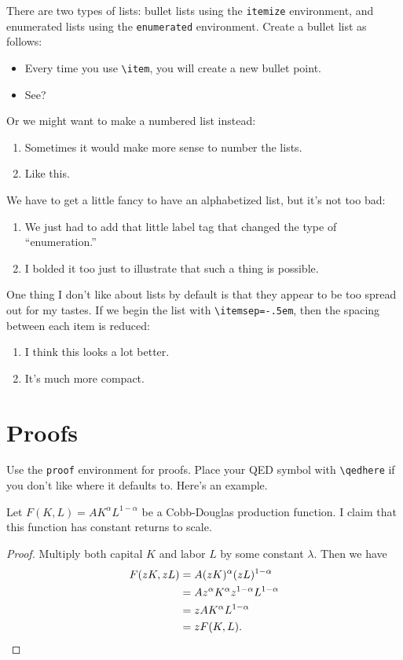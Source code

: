\documentclass[12pt]{article}
\begin{document}
There are two types of lists: bullet lists using the \verb|itemize| environment, and 
enumerated lists using the \verb|enumerated| environment. Create a bullet list as 
follows:
\begin{itemize}	
	\item Every time you use \verb|\item|, you will create a new bullet point.
	
	\item See?
\end{itemize}
Or we might want to make a numbered list instead:
\begin{enumerate}
	\item Sometimes it would make more sense to number the lists.
	
	\item Like this. 
\end{enumerate}
We have to get a little fancy to have an alphabetized list, but it's not too bad:
\begin{enumerate}[label=\textbf{(\alph*)}]
	\item We just had to add that little label tag that changed the type of ``enumeration.''
	
	\item I bolded it too just to illustrate that such a thing is possible.
\end{enumerate}
One thing I don't like about lists by default is that they appear to be too spread out for 
my tastes. If we begin the list with \verb|\itemsep=-.5em|, then the spacing between 
each item is reduced:
\begin{enumerate}[label=\textbf{(\Alph*)}]
	\itemsep-.5em
	\item I think this looks a lot better.	
	\item It's much more compact. 
\end{enumerate}
	
	

\section{Proofs}

Use the \verb|proof| environment for proofs. Place your QED symbol with \verb|\qedhere| 
if you don't like where it defaults to. Here's an example.


Let $F(K,L)=AK^{\alpha}L^{1 - \alpha}$ be a Cobb-Douglas production function. I claim 
that this function has constant returns to scale.

\begin{proof}
	Multiply both capital $K$ and labor $L$ by some constant $\lambda$. Then we have
	\begin{align*}
		F(zK, zL) 	&=	A(zK)^{\alpha}(zL)^{1 - \alpha}	\\
				&=	Az^{\alpha}K^{\alpha}z^{1-\alpha}L^{1 - \alpha}	\\
				&=	zAK^{\alpha}L^{1 - \alpha}	\\
				&=	zF(K, L). 	\qedhere
	\end{align*}
\end{proof}
\end{document}

